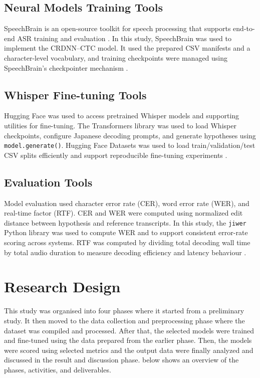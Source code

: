 \subsection{Neural Models Training Tools}
SpeechBrain is an open-source toolkit for speech processing that supports end-to-end ASR training and evaluation \parencite{ravanelli2021speechbraingeneralpurposespeechtoolkit}. In this study, SpeechBrain was used to implement the CRDNN--CTC model. It used the prepared CSV manifests and a character-level vocabulary, and training checkpoints were managed using SpeechBrain's checkpointer mechanism \parencite{speechbrain_v1}.

\subsection{Whisper Fine-tuning Tools}
Hugging Face was used to access pretrained Whisper models and supporting utilities for fine-tuning. The Transformers library was used to load Whisper checkpoints, configure Japanese decoding prompts, and generate hypotheses using \texttt{model.generate()}. Hugging Face Datasets was used to load train/validation/test CSV splits efficiently and support reproducible fine-tuning experiments \parencite{wolf2020huggingfacestransformersstateoftheartnatural}.

\subsection{Evaluation Tools}
Model evaluation used character error rate (CER), word error rate (WER), and real-time factor (RTF). CER and WER were computed using normalized edit distance between hypothesis and reference transcripts. In this study, the \texttt{jiwer} Python library was used to compute WER and to support consistent error-rate scoring across systems. RTF was computed by dividing total decoding wall time by total audio duration to measure decoding efficiency and latency behaviour \parencite{jiwer_2025}.

\section{Research Design}
This study was organised into four phases where it started from a preliminary study. It then moved to the data collection and preprocessing phase where the dataset was compiled and processed. After that, the selected models were trained and fine-tuned using the data prepared from the earlier phase. Then, the models were scored using selected metrics and the output data were finally analyzed and discussed in the result and discussion phase.  below shows an overview of the phases, activities, and deliverables.

